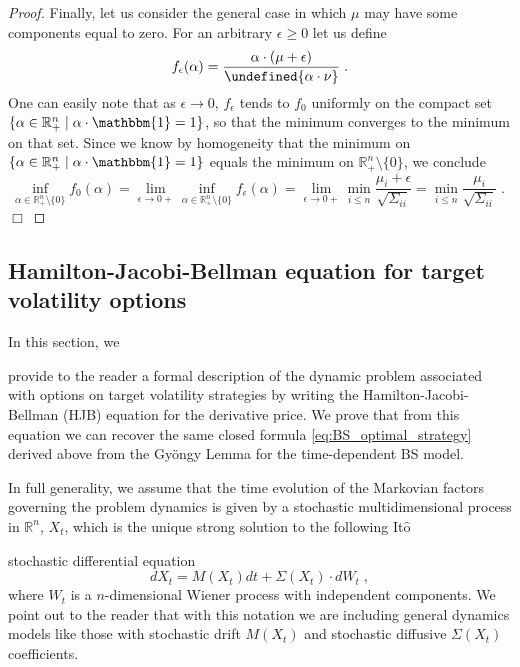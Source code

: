 \documentclass[runningheads]{m2ef}
\let\norm\undefined %
\DeclarePairedDelimiter\norm{\lVert}{\rVert}
\newcommand\soutpars[1]{\let\helpcmd\sout\parhelp#1\par\relax\relax}
\newcommand{\change}[1]{{\color{red} {#1}}}%
\newcommand{\remove}[1]{{\color{red} \soutpars{{#1}}}}%
\begin{document}
\begin{proof}
	Finally, let us consider the general case in which $\mu$ may have some components equal to zero. For an arbitrary $\epsilon \geq 0$ let us define
	\begin{equation}
	f_{\epsilon}(\alpha) = \frac{\alpha \cdot (\mu+\epsilon)}{\norm{\alpha \cdot \nu}} \; .
	\end{equation}
	One can easily note that as $\epsilon \to 0$, $f_{\epsilon}$ tends to $f_{0}$ uniformly on the compact set $\{\alpha \in \mathbb{R}^n_+ \mid \alpha \cdot \mathbbm{1} = 1\}$, so that the minimum converges to the minimum on that set. Since we know by homogeneity that the minimum on $\{\alpha \in \mathbb{R}^n_+ \mid \alpha \cdot \mathbbm{1} = 1\}$ equals the minimum on $\mathbb{R}^n_+ \setminus \{0\}$, we conclude
	\begin{equation}
	\inf_{\alpha \in \mathbb{R}_{+}^n \setminus \{0\}} f_0(\alpha) = 
	\lim_{\epsilon \to 0+} \inf_{\alpha \in \mathbb{R}_{+}^n \setminus \{0\}} f_{\epsilon}(\alpha) = 
	\lim_{\epsilon \to 0+} \min_{i\leq n} \frac{\mu_i+\epsilon}{\sqrt{\Sigma_{ii}}} =
	\min_{i\leq n} \frac{\mu_i}{\sqrt{\Sigma_{ii}}} \; . \; 
	\end{equation} $\Box$
\end{proof}


\subsection{Hamilton-Jacobi-Bellman equation for target volatility options}\label{subsec:HJB}
In this section, we \remove{want to} provide to the reader a formal description of the dynamic problem associated with options on target volatility strategies by writing the Hamilton-Jacobi-Bellman (HJB) equation for the derivative price. We prove that from this equation we can recover the same closed formula \eqref{eq:BS_optimal_strategy} derived above from the Gy\"ongy Lemma for the time-dependent BS model. 

In full generality, we assume that the time evolution of the Markovian factors governing the problem dynamics is given by  a stochastic multidimensional process in $\mathbb{R}^n$, $X_t$, which is the unique strong solution to the following It$\hat{\text{o}}$ \remove{SDE} \change{stochastic differential equation} 
\begin{equation}
		dX_t = M(X_t)dt + \Sigma(X_t) \cdot dW_t \; ,
\end{equation}
where $W_t$ is a $n$-dimensional Wiener process with independent components. We point out to the reader that with this notation we are including general dynamics models like those with stochastic drift $M(X_t)$ and stochastic diffusive $\Sigma(X_t)$ coefficients. 
\end{document}
